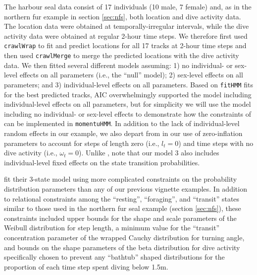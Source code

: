 \documentclass[12pt]{article}\usepackage[]{graphicx}\usepackage[]{color}
\begin{document}
The harbour seal data consist of 17 individuals (10 male, 7 female) and, as in the northern fur example in section \ref{sec:nfs}, both location and dive activity data. The location data were obtained at temporally-irregular intervals, while the dive activity data were obtained at regular 2-hour time steps. We therefore first used \verb|crawlWrap| to fit and predict locations for all 17 tracks at 2-hour time steps and then used \verb|crawlMerge| to merge the predicted locations with the dive activity data. We then fitted several different models assuming: 1) no individual- or sex-level effects on all parameters (i.e., the ``null'' model); 2) sex-level effects on all parameters; and 3) individual-level effects on all parameters.  Based on \verb|fitHMM| fits for the best predicted tracks, AIC overwhelmingly supported the model including individual-level effects on all parameters, but for simplicity we will use the model including no individual- or sex-level effects to demonstrate how the constraints of \cite{McClintockEtAl2013c} can be implemented in \verb|momentuHMM|.  In addition to the lack of individual-level random effects in our example, we also depart from \cite{McClintockEtAl2013c} in our use of zero-inflation parameters to account for steps of length zero (i.e., $l_t=0$) and time steps with no dive activity (i.e., $\omega_t=0$). Unlike \cite{McClintockEtAl2013c}, note that our model 3 also includes individual-level fixed effects on the state transition probabilities.

\cite{McClintockEtAl2013c} fit their 3-state model using more complicated constraints on the probability distribution parameters than any of our previous vignette examples. In addition to relational constraints among the ``resting'', ``foraging'', and ``transit'' states similar to those used in the northern fur seal example (section \ref{sec:nfs}), these constraints included upper bounds for the shape and scale parameters of the Weibull distribution for step length, a minimum value for the ``transit'' concentration parameter of the wrapped Cauchy distribution for turning angle, and bounds on the shape parameters of the beta distribution for dive activity specifically chosen to prevent any ``bathtub'' shaped distributions for the proportion of each time step spent diving below 1.5m. 
\end{document}
